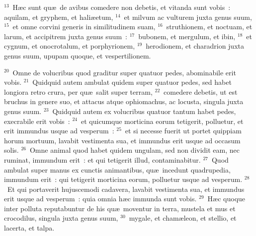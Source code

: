 ${}^{13}$~H\ae c sunt qu\ae\ de avibus comedere non debetis, et vitanda sunt vobis~: aquilam, et gryphem, et hali\ae etum,
${}^{14}$~et milvum ac vulturem juxta genus suum,
${}^{15}$~et omne corvini generis in similitudinem suam,
${}^{16}$~struthionem, et noctuam, et larum, et accipitrem juxta genus suum~:
${}^{17}$~bubonem, et mergulum, et ibin,
${}^{18}$~et cygnum, et onocrotalum, et porphyrionem,
${}^{19}$~herodionem, et charadrion juxta genus suum, upupam quoque, et vespertilionem.


${}^{20}$~Omne de volucribus quod graditur super quatuor pedes, abominabile erit vobis.
${}^{21}$~Quidquid autem ambulat quidem super quatuor pedes, sed habet longiora retro crura, per qu\ae\ salit super terram,
${}^{22}$~comedere debetis, ut est bruchus in genere suo, et attacus atque ophiomachus, ac locusta, singula juxta genus suum.
${}^{23}$~Quidquid autem ex volucribus quatuor tantum habet pedes, execrabile erit vobis~:
${}^{24}$~et quicumque morticina eorum tetigerit, polluetur, et erit immundus usque ad vesperum~:
${}^{25}$~et si necesse fuerit ut portet quippiam horum mortuum, lavabit vestimenta sua, et immundus erit usque ad occasum solis.
${}^{26}$~Omne animal quod habet quidem ungulam, sed non dividit eam, nec ruminat, immundum erit~: et qui tetigerit illud, contaminabitur.
${}^{27}$~Quod ambulat super manus ex cunctis animantibus, qu\ae\ incedunt quadrupedia, immundum erit~: qui tetigerit morticina eorum, polluetur usque ad vesperum.
${}^{28}$~Et qui portaverit hujuscemodi cadavera, lavabit vestimenta sua, et immundus erit usque ad vesperum~: quia omnia h\ae c immunda sunt vobis.
${}^{29}$~H\ae c quoque inter polluta reputabuntur de his qu\ae\ moventur in terra, mustela et mus et crocodilus, singula juxta genus suum,
${}^{30}$~mygale, et cham\ae leon, et stellio, et lacerta, et talpa.


